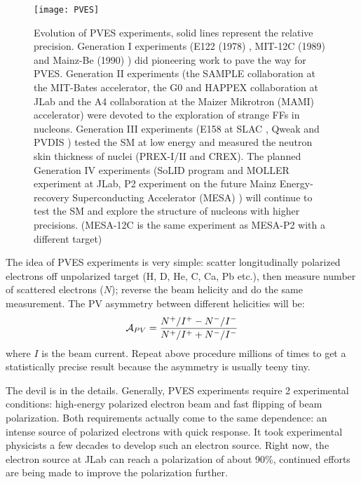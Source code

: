 \begin{figure}[h!]
    \centering
    \texttt{[image: PVES]}
    \caption{Evolution of PVES experiments, solid lines represent the relative 
    precision. Generation I experiments (E122 (1978) \cite{PRESCOTT1978347}, 
    MIT-12C (1989) \cite{PhysRevLett.65.694} and Mainz-Be (1990) \cite{HEIL19891}) 
    did pioneering work to pave the way for PVES. Generation II experiments
    (the SAMPLE collaboration \cite{SAMPLE} at the MIT-Bates accelerator, 
    the G0 \cite{G0} and HAPPEX \cite{HAPPEX} collaboration at JLab and
    the A4 collaboration \cite{A4} at the Maizer Mikrotron (MAMI) accelerator) 
    were devoted to the exploration of strange FFs in nucleons.
    Generation III experiments (E158 at SLAC \cite{PhysRevLett.95.081601}, 
    Qweak \cite{PhysRevLett.111.141803} and PVDIS \cite{PhysRevLett.111.082501})
    tested the SM at low energy and measured the neutron skin thickness of nuclei
    (PREX-I/II and CREX). The planned Generation IV experiments (SoLID program \cite{SoLID}
    and MOLLER experiment \cite{Moller} at JLab, P2 experiment on the future
    Mainz Energy-recovery Superconducting Accelerator (MESA) \cite{MESA-P2})
    will continue to test the SM and explore the structure of nucleons with higher precisions.
    (MESA-12C is the same experiment as MESA-P2 with a different \C target) }
\end{figure}

The idea of PVES experiments is very simple: scatter longitudinally polarized
electrons off unpolarized target (H, D, He, C, Ca, Pb etc.), then measure 
number of scattered electrons ($N$); reverse the beam helicity 
and do the same measurement. The PV asymmetry between different helicities will be:
\begin{equation}
    \mathcal{A}_{PV} = \frac{N^+/I^+ - N^-/I^-}{N^+/I^+ + N^-/I^-}
\end{equation}
where $I$ is the beam current.
Repeat above procedure millions of times to get a statistically precise result
because the asymmetry is usually teeny tiny.

The devil is in the details.
Generally, PVES experiments require 2 experimental conditions: high-energy polarized electron
beam and fast flipping of beam polarization. Both requirements actually come to 
the same dependence: an intense source of polarized electrons with quick response. 
It took experimental physicists a few decades to develop such an electron source.
Right now, the electron source at JLab can reach a polarization of about 90\%,
continued efforts are being made to improve the polarization further.

